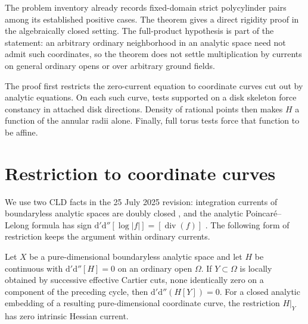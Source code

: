 \documentclass[11pt,a4paper]{amsart}
\begin{document}
The problem inventory already records fixed-domain strict polycylinder pairs among its established positive cases. The theorem gives a direct rigidity proof in the algebraically closed setting. The full-product hypothesis is part of the statement: an arbitrary ordinary neighborhood in an analytic space need not admit such coordinates, so the theorem does not settle multiplication by currents on general ordinary opens or over arbitrary ground fields.

The proof first restricts the zero-current equation to coordinate curves cut out by analytic equations. On each such curve, tests supported on a disk skeleton force constancy in attached disk directions. Density of rational points then makes $H$ a function of the annular radii alone. Finally, full torus tests force that function to be affine.

\section{Restriction to coordinate curves}\label{sec:restriction}

We use two CLD facts in the 25 July 2025 revision: integration currents of boundaryless analytic spaces are doubly closed \cite[Proposition~7.7.9]{CLD12}, and the analytic Poincar\'e--Lelong formula has sign $\mathrm d'\mathrm d''[\log|f|]=[\operatorname{div}(f)]$ \cite[Theorem~16.7.3]{CLD12}. The following form of restriction keeps the argument within ordinary currents.

\begin{lemma}\label{lem:cartier-restriction}
Let $X$ be a pure-dimensional boundaryless analytic space and let $H$ be continuous with $\mathrm d'\mathrm d''[H]=0$ on an ordinary open $\Omega$. If $Y\subset\Omega$ is locally obtained by successive effective Cartier cuts, none identically zero on a component of the preceding cycle, then $\mathrm d'\mathrm d''(H[Y])=0$. For a closed analytic embedding of a resulting pure-dimensional coordinate curve, the restriction $H|_Y$ has zero intrinsic Hessian current.
\end{lemma}
\end{document}
